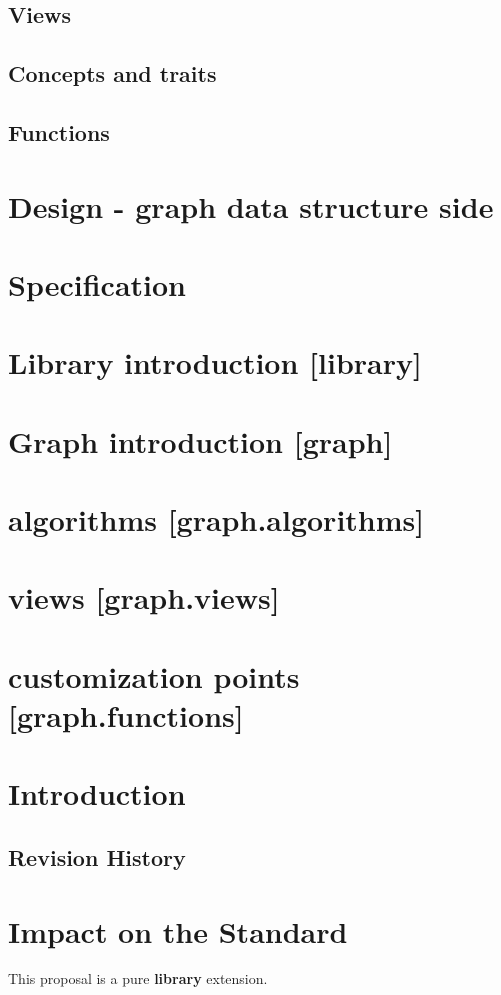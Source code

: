 \documentclass[10pt,onecolumn]{article}
\begin{document}
\subsection{Views}
\subsection{Concepts and traits}
\subsection{Functions}
\section{Design - graph data structure side}
\section{Specification}
\section{Library introduction [library]}
\section{Graph introduction [graph]}
\section{algorithms [graph.algorithms]}
\section{views [graph.views]}
\section{customization points [graph.functions]}


\section{Introduction}
\subsection{Revision History}
\section{Impact on the Standard}
This proposal is a pure \textbf{library} extension.
\end{document}
